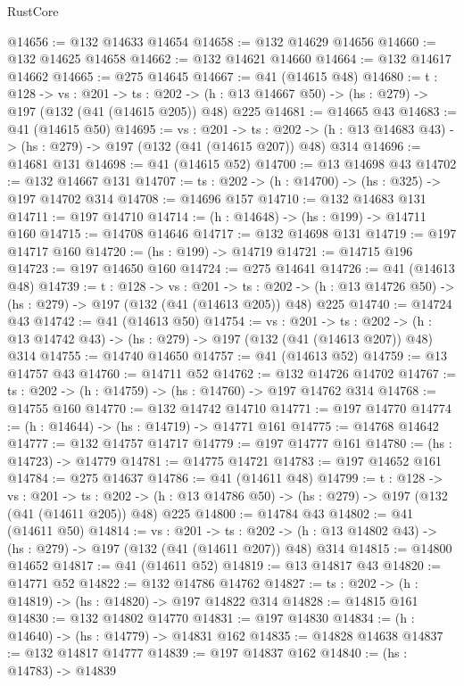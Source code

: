 \begin{lexlean}{RustCore}
\begin{coremodule}
@14656 := @132 @14633 @14654
@14658 := @132 @14629 @14656
@14660 := @132 @14625 @14658
@14662 := @132 @14621 @14660
@14664 := @132 @14617 @14662
@14665 := @275 @14645
@14667 := @41 (@14615 @48)
@14680 := {t : @128} ->
  {vs : @201} ->
  {ts : @202} -> (h : @13 @14667 @50) -> (hs : @279) -> @197 (@132 (@41 (@14615 @205)) @48) @225
@14681 := @14665 @43
@14683 := @41 (@14615 @50)
@14695 := {vs : @201} ->
  {ts : @202} -> (h : @13 @14683 @43) -> (hs : @279) -> @197 (@132 (@41 (@14615 @207)) @48) @314
@14696 := @14681 @131
@14698 := @41 (@14615 @52)
@14700 := @13 @14698 @43
@14702 := @132 @14667 @131
@14707 := {ts : @202} -> (h : @14700) -> (hs : @325) -> @197 @14702 @314
@14708 := @14696 @157
@14710 := @132 @14683 @131
@14711 := @197 @14710
@14714 := (h : @14648) -> (hs : @199) -> @14711 @160
@14715 := @14708 @14646
@14717 := @132 @14698 @131
@14719 := @197 @14717 @160
@14720 := (hs : @199) -> @14719
@14721 := @14715 @196
@14723 := @197 @14650 @160
@14724 := @275 @14641
@14726 := @41 (@14613 @48)
@14739 := {t : @128} ->
  {vs : @201} ->
  {ts : @202} -> (h : @13 @14726 @50) -> (hs : @279) -> @197 (@132 (@41 (@14613 @205)) @48) @225
@14740 := @14724 @43
@14742 := @41 (@14613 @50)
@14754 := {vs : @201} ->
  {ts : @202} -> (h : @13 @14742 @43) -> (hs : @279) -> @197 (@132 (@41 (@14613 @207)) @48) @314
@14755 := @14740 @14650
@14757 := @41 (@14613 @52)
@14759 := @13 @14757 @43
@14760 := @14711 @52
@14762 := @132 @14726 @14702
@14767 := {ts : @202} -> (h : @14759) -> (hs : @14760) -> @197 @14762 @314
@14768 := @14755 @160
@14770 := @132 @14742 @14710
@14771 := @197 @14770
@14774 := (h : @14644) -> (hs : @14719) -> @14771 @161
@14775 := @14768 @14642
@14777 := @132 @14757 @14717
@14779 := @197 @14777 @161
@14780 := (hs : @14723) -> @14779
@14781 := @14775 @14721
@14783 := @197 @14652 @161
@14784 := @275 @14637
@14786 := @41 (@14611 @48)
@14799 := {t : @128} ->
  {vs : @201} ->
  {ts : @202} -> (h : @13 @14786 @50) -> (hs : @279) -> @197 (@132 (@41 (@14611 @205)) @48) @225
@14800 := @14784 @43
@14802 := @41 (@14611 @50)
@14814 := {vs : @201} ->
  {ts : @202} -> (h : @13 @14802 @43) -> (hs : @279) -> @197 (@132 (@41 (@14611 @207)) @48) @314
@14815 := @14800 @14652
@14817 := @41 (@14611 @52)
@14819 := @13 @14817 @43
@14820 := @14771 @52
@14822 := @132 @14786 @14762
@14827 := {ts : @202} -> (h : @14819) -> (hs : @14820) -> @197 @14822 @314
@14828 := @14815 @161
@14830 := @132 @14802 @14770
@14831 := @197 @14830
@14834 := (h : @14640) -> (hs : @14779) -> @14831 @162
@14835 := @14828 @14638
@14837 := @132 @14817 @14777
@14839 := @197 @14837 @162
@14840 := (hs : @14783) -> @14839

\end{coremodule}
\end{lexlean}

